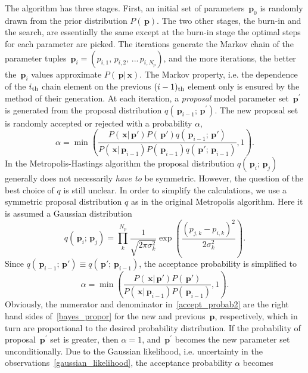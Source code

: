 \documentclass[preprint2]{aastex}
\newcommand{\bp}{\,\mathbf{p}}
\newcommand{\bx}{\,\mathbf{x}}
\begin{document}
The algorithm has three stages. First, an initial set of parameters $\bp_0$ is randomly drawn from the prior distribution $P(\bp)$. The two other stages, the burn-in and the search, are essentially the same except at the burn-in stage the optimal steps for each parameter are picked. The iterations generate the Markov chain of the parameter tuples $\bp_i = \left(p_{i,1},\, p_{i,2},\, ...\, p_{i,N_p} \right)$, and the more iterations, the better the $\bp_i$ values approximate $P(\bp|\bx)$. The Markov property, i.e. the dependence of the $i_{\rm th}$ chain element on the previous $(i-1)_{\rm th}$ element only is ensured by the method of their generation. At each iteration, a \emph{proposal} model parameter set $\bp^\prime$ is generated from the proposal distribution $q(\bp_{i-1};\bp^\prime)$. The new proposal set is randomly accepted or rejected with a probability $\alpha$,
\begin{equation}
  \label{accept_probab}
  \alpha =  \min \left( \frac{P(\bx|\bp')P(\bp')q(\bp_{i-1};\bp')} 
            {P(\bx|\bp_{i-1})P(\bp_{i-1})q(\bp';\bp_{i-1})}, 1 \right).
\end{equation}
In the Metropolis-Hastings algorithm the proposal distribution $q(\bp_i;\bp_j)$ generally does not necessarily \emph{have to} be symmetric. However, the question of the best choice of $q$ is still unclear. In order to simplify the calculations, we use a symmetric proposal distribution $q$ as in the original Metropolis algorithm. Here it is  assumed a Gaussian distribution
\begin{equation}
  \label{gaussian_prop_distr}
  q(\bp_i;\bp_j) = \prod^{N_p}_{k} \frac{1}{\sqrt{2 \pi \sigma^2_k}} 
                   \exp \left( \frac{(p_{j,k} - p_{i,k})^2}{2 \sigma^2_k} \right).
\end{equation}
Since $q(\bp_{i-1};\bp') \equiv q(\bp';\bp_{i-1})$, the acceptance probability is simplified to
\begin{equation}
  \label{accept_probab2}
  \alpha =  \min \left( \frac{P(\bx|\bp')P(\bp')} {P(\bx|\bp_{i-1})P(\bp_{i-1})}, 1 \right).
\end{equation}
Obviously, the numerator and denominator in~\eqref{accept_probab2} are the right hand sides of~\eqref{bayes_propor} for the new and previous $\bp$, respectively, which in turn are proportional to the desired probability distribution. If the probability of proposal $\bp^\prime$ set is greater, then $\alpha = 1$, and $\bp^\prime$ becomes the new parameter set unconditionally. Due to the Gaussian likelihood, i.e. uncertainty in the observations~\eqref{gaussian_likelihood}, the acceptance probability $\alpha$ becomes
\end{document}
